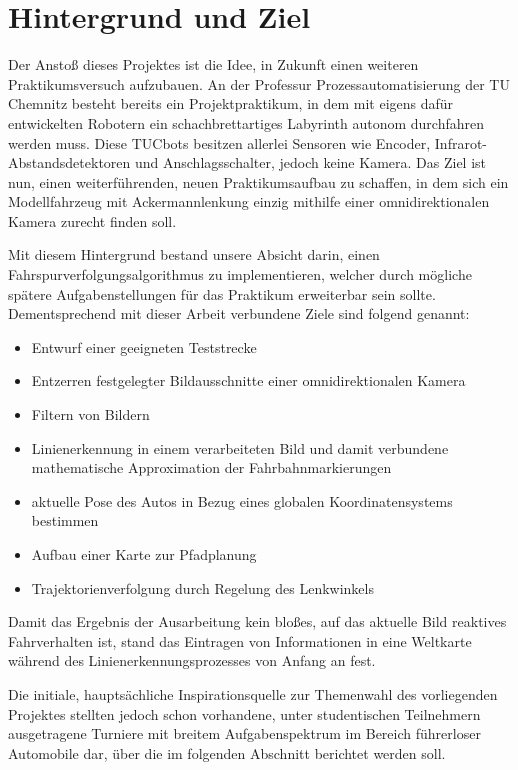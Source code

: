 \section{Hintergrund und Ziel \dcfirstauthorshort}

Der Anstoß dieses Projektes ist die Idee, in Zukunft einen weiteren Praktikumsversuch aufzubauen. An der Professur Prozessautomatisierung der TU Chemnitz besteht bereits ein Projektpraktikum, in dem mit eigens dafür entwickelten Robotern ein schachbrettartiges Labyrinth autonom durchfahren werden muss. Diese \glqq TUCbots\grqq{} besitzen allerlei Sensoren wie Encoder, Infrarot-Abstandsdetektoren und Anschlagsschalter, jedoch keine Kamera. Das Ziel ist nun, einen weiterführenden, neuen Praktikumsaufbau zu schaffen, in dem sich ein Modellfahrzeug mit Ackermannlenkung einzig mithilfe einer omnidirektionalen Kamera zurecht finden soll. 

Mit diesem Hintergrund bestand unsere Absicht darin, einen Fahrspurverfolgungsalgorithmus zu implementieren, welcher durch mögliche spätere Aufgabenstellungen für das Praktikum erweiterbar sein sollte. Dementsprechend mit dieser Arbeit verbundene Ziele sind folgend genannt:

\begin{itemize}
\item Entwurf einer geeigneten Teststrecke
\item Entzerren festgelegter Bildausschnitte einer omnidirektionalen Kamera
\item Filtern von Bildern
\item Linienerkennung in einem verarbeiteten Bild und damit verbundene mathematische Approximation der Fahrbahnmarkierungen
\item aktuelle Pose des Autos in Bezug eines globalen Koordinatensystems bestimmen
\item Aufbau einer Karte zur Pfadplanung
\item Trajektorienverfolgung durch Regelung des Lenkwinkels
\end{itemize}

Damit das Ergebnis der Ausarbeitung kein bloßes, auf das aktuelle Bild reaktives Fahrverhalten ist, stand das Eintragen von Informationen in eine Weltkarte während des Linienerkennungsprozesses von Anfang an fest. 

Die initiale, hauptsächliche Inspirationsquelle zur Themenwahl des vorliegenden Projektes stellten jedoch schon vorhandene, unter studentischen Teilnehmern ausgetragene Turniere mit breitem Aufgabenspektrum im Bereich führerloser Automobile dar, über die im folgenden Abschnitt berichtet werden soll.
